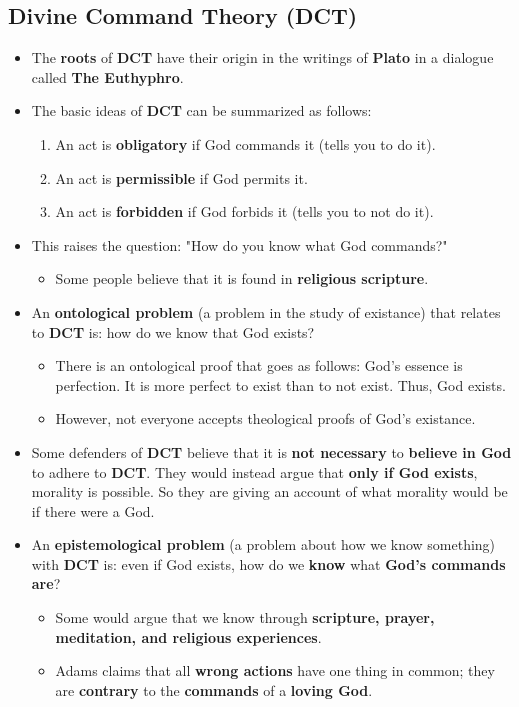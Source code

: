 \documentclass{article}
\begin{document}
    \subsection*{Divine Command Theory (DCT)}
    \begin{itemize}
        \item The \textbf{roots} of \textbf{DCT} have their origin in the writings of \textbf{Plato} in a dialogue called \textbf{The Euthyphro}.
        \item The basic ideas of \textbf{DCT} can be summarized as follows: 
        \begin{enumerate}
            \item An act is \textbf{obligatory} if God commands it (tells you to do it).
            \item An act is \textbf{permissible} if God permits it.
            \item An act is \textbf{forbidden} if God forbids it (tells you to not do it).
        \end{enumerate}
        \item This raises the question: "How do you know what God commands?"
        \begin{itemize}
            \item Some people believe that it is found in \textbf{religious scripture}.
        \end{itemize}
        \item An \textbf{ontological problem} (a problem in the study of existance) that relates to \textbf{DCT} is: how do we know that God exists?
        \begin{itemize}
            \item There is an ontological proof that goes as follows: God's essence is perfection. It is more perfect to exist than to not exist. Thus, God exists.
            \item However, not everyone accepts theological proofs of God's existance.
        \end{itemize}
        \item Some defenders of \textbf{DCT} believe that it is \textbf{not necessary} to \textbf{believe in God} to adhere to \textbf{DCT}. They would instead argue that \textbf{only if God exists}, morality is possible. So they are giving an account of what morality would be if there were a God.
        \item An \textbf{epistemological problem} (a problem about how we know something) with \textbf{DCT} is: even if God exists, how do we \textbf{know} what \textbf{God's commands are}?
        \begin{itemize}
            \item Some would argue that we know through \textbf{scripture, prayer, meditation, and religious experiences}.
            \item Adams claims that all \textbf{wrong actions} have one thing in common; they are \textbf{contrary} to the \textbf{commands} of a \textbf{loving God}.
        \end{itemize}
    \end{itemize}
\end{document}
